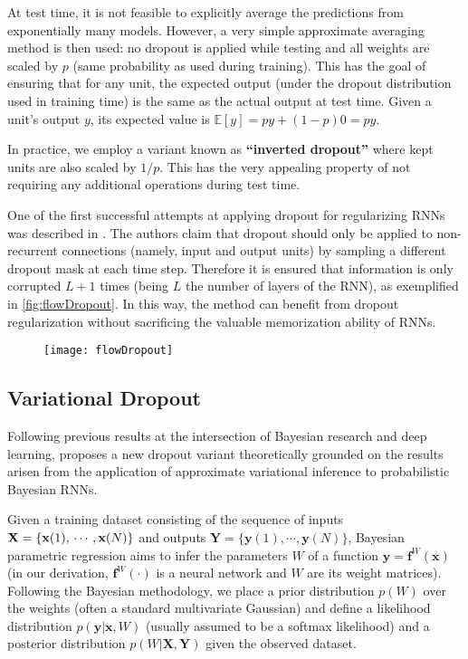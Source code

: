 At test time, it is not feasible to explicitly average the predictions from exponentially many models. However, a very simple approximate averaging method is then used: no dropout is applied while testing and all weights are scaled by $p$ (same probability as used during training). This has the goal of ensuring that for any unit, the expected output (under the dropout distribution used in training time) is the same as the actual output at test time. Given a unit's output $y$, its expected value is $\mathbb{E}[y]=py+(1-p)0=py$.

In practice, we employ a variant known as \textbf{``inverted dropout''} where kept units are also scaled by $1/p$. This has the very appealing property of not requiring any additional operations during test time.

One of the first successful attempts at applying dropout for regularizing RNNs was described in \cite{zaremba2014recurrent}. The authors claim that dropout should only be applied to non-recurrent connections (namely, input and output units) by sampling a different dropout mask at each time step. Therefore it is ensured that information is only corrupted $L+1$ times (being $L$ the number of layers of the RNN), as exemplified in \autoref{fig:flowDropout}. In this way, the method can benefit from dropout regularization without sacrificing the valuable memorization ability of RNNs.

\begin{figure}[H]
	\centering
	\texttt{[image: flowDropout]}
	\label{fig:flowDropout}
\end{figure}

\subsection{Variational Dropout}

Following previous results at the intersection of Bayesian research and deep learning, \cite{gal2016theoretically} proposes a new dropout variant theoretically grounded on the results arisen from the application of approximate variational inference to probabilistic Bayesian RNNs. 

Given a training dataset consisting of the sequence of inputs $\mathbf{X}=\{\mathbf{x}(1),\\\cdots,\mathbf{x}(N)\}$ and outputs $\mathbf{Y}=\{\mathbf{y}(1),\cdots,\mathbf{y}(N)\}$, Bayesian parametric regression aims to infer the parameters $W$ of a function $\mathbf{y}=\mathbf{f}^W(\mathbf{x})$ (in our derivation, $\mathbf{f}^W(\cdot)$ is a neural network and $W$ are its weight matrices). Following the Bayesian methodology, we place a prior distribution $p(W)$ over the weights (often a standard multivariate Gaussian) and define a likelihood distribution $p(\mathbf{y} |\mathbf{x}, W)$ (usually assumed to be a softmax likelihood) and a posterior distribution $p(W | \mathbf{X}, \mathbf{Y})$ given the observed dataset.

